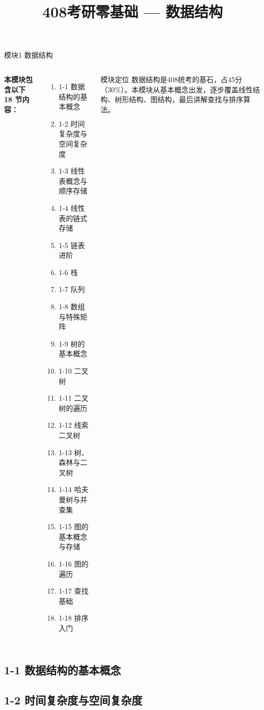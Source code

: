 \documentclass[10pt, aspectratio=169]{beamer}
\title{408考研零基础 --- 数据结构}
\author{}
\date{}
\begin{document}
\frame{\titlepage}

\begin{frame}{模块1 数据结构}
    \begin{columns}[T]
        \textbf{本模块包含以下 18 节内容：}
        \begin{enumerate}
            \item 1-1 数据结构的基本概念
            \item 1-2 时间复杂度与空间复杂度
            \item 1-3 线性表概念与顺序存储
            \item 1-4 线性表的链式存储
            \item 1-5 链表进阶
            \item 1-6 栈
            \item 1-7 队列
            \item 1-8 数组与特殊矩阵
            \item 1-9 树的基本概念
            \item 1-10 二叉树
            \item 1-11 二叉树的遍历
            \item 1-12 线索二叉树
            \item 1-13 树、森林与二叉树
            \item 1-14 哈夫曼树与并查集
            \item 1-15 图的基本概念与存储
            \item 1-16 图的遍历
            \item 1-17 查找基础
            \item 1-18 排序入门
        \end{enumerate}
        \begin{block}{模块定位}
            数据结构是408统考的基石，占45分（30\%）。本模块从基本概念出发，逐步覆盖线性结构、树形结构、图结构，最后讲解查找与排序算法。
        \end{block}
    \end{columns}
\end{frame}

\subsection{1-1 数据结构的基本概念}


\subsection{1-2 时间复杂度与空间复杂度}

\end{document}
